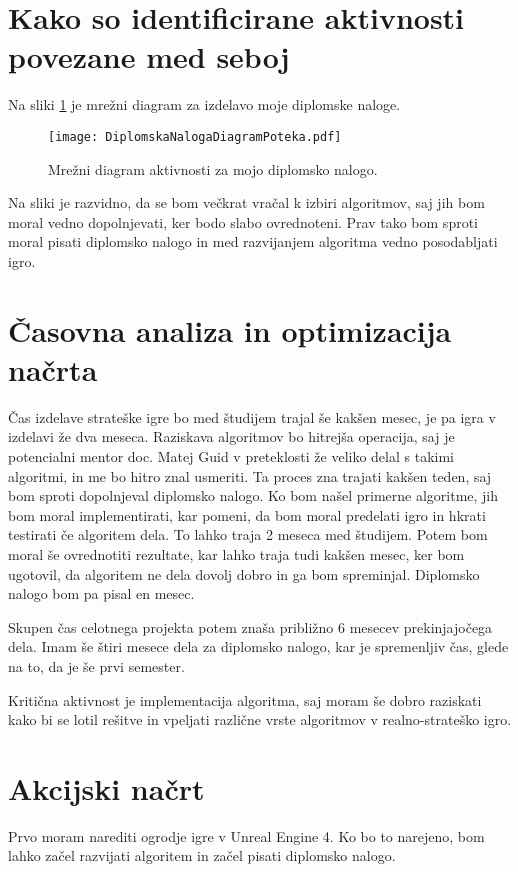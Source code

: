 \documentclass[11pt,a4paper]{article}
\begin{document}
\section{Kako so identificirane aktivnosti povezane med seboj}

Na sliki \ref{sl:mreza} je mrežni diagram za izdelavo moje diplomske naloge.

\begin{figure}[htb]
\centerline{\texttt{[image: DiplomskaNalogaDiagramPoteka.pdf]}}
\caption{Mrežni diagram aktivnosti za mojo diplomsko nalogo.}
\label{sl:mreza}
\end{figure}

Na sliki je razvidno, da se bom večkrat vračal k izbiri algoritmov, saj jih bom moral vedno dopolnjevati, ker bodo slabo ovrednoteni.
Prav tako bom sproti moral pisati diplomsko nalogo in med razvijanjem algoritma vedno posodabljati igro.

\section{Časovna analiza in optimizacija načrta}

Čas izdelave strateške igre bo med študijem trajal še kakšen mesec, je pa igra v izdelavi že dva meseca. Raziskava algoritmov bo hitrejša operacija, saj je potencialni mentor doc. Matej Guid v preteklosti že veliko delal s takimi algoritmi, in me bo hitro znal usmeriti.
Ta proces zna trajati kakšen teden, saj bom sproti dopolnjeval diplomsko nalogo.
Ko bom našel primerne algoritme, jih bom moral implementirati, kar pomeni, da bom moral predelati igro in hkrati testirati če algoritem dela. To lahko traja 2 meseca med študijem.
Potem bom moral še ovrednotiti rezultate, kar lahko traja tudi kakšen mesec, ker bom ugotovil, da algoritem ne dela dovolj dobro in ga bom spreminjal.
Diplomsko nalogo bom pa pisal en mesec.

Skupen čas celotnega projekta potem znaša približno 6 mesecev prekinjajočega dela.
Imam še štiri mesece dela za diplomsko nalogo, kar je spremenljiv čas, glede na to, da je še prvi semester.

Kritična aktivnost je implementacija algoritma, saj moram še dobro raziskati kako bi se lotil rešitve in vpeljati različne vrste algoritmov v realno-strateško igro.


\section{Akcijski načrt}
Prvo moram narediti ogrodje igre v Unreal Engine 4. Ko bo to narejeno, bom lahko začel razvijati algoritem in začel pisati diplomsko nalogo.
\end{document}

